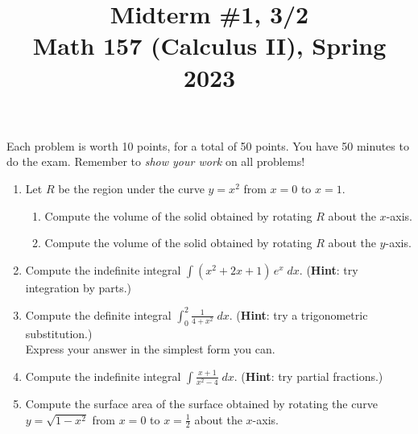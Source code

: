 \documentclass[11pt]{article}
\title{Midterm \#1, 3/2 \\ Math 157 (Calculus II), Spring 2023}
\date{}
\begin{document}
\maketitle

\thispagestyle{empty}

\vspace{-1cm}

Each problem is worth 10 points, for a total of 50 points. You have 50 minutes to do the exam. Remember to \emph{show your work} on all problems!

\begin{enumerate}
\item Let $R$ be the region under the curve $y=x^2$ from $x=0$ to $x=1$. \begin{enumerate}
\item Compute the volume of the solid obtained by rotating $R$ about the $x$-axis.
\item Compute the volume of the solid obtained by rotating $R$ about the $y$-axis.
\end{enumerate}
\item Compute the indefinite integral $\displaystyle \int (x^2+2x+1) \, e^{x} \; dx$. ({\bf Hint}: try integration by parts.)
\item Compute the definite integral $\displaystyle \int_{0}^{2} \frac{1}{4+x^2} \; dx$. ({\bf Hint}: try a trigonometric substitution.) \\ Express your answer in the simplest form you can.
\item Compute the indefinite integral $\displaystyle \int \frac{x+1}{x^2-4} \; dx$. ({\bf Hint}: try partial fractions.)
\item Compute the surface area of the surface obtained by rotating the curve $y=\sqrt{1-x^2}$ from $x=0$ to $x=\frac{1}{2}$ about the $x$-axis.
\end{enumerate}
\end{document}
